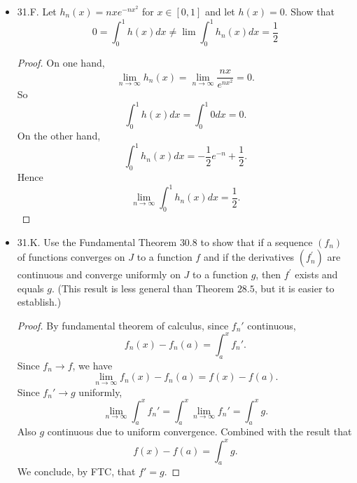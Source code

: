 \begin{itemize}
\item 31.F. Let $h_n(x)=n x e^{-n x^2}$ for $x \in[0,1]$ and let $h(x)=0$. Show that
\[
0=\int_0^1 h(x) d x \neq \lim \int_0^1 h_n(x) d x=\frac{1}{2}
\]
\begin{proof}
	On one hand, 
	\[
		\lim_{n \to \infty} h_n(x) = \lim_{n \to \infty} \frac{nx }{e^{n x^2}} = 0
	.\] 
	So
	\[
		\int _0^1 h(x) dx = \int _0^1 0 dx = 0
	.\] 
	On the other hand,
	\[
		\int_0^1 h_n(x)dx = -\frac{1}{2}e^{-n} + \frac{1}{2}
	.\] 
	Hence
	\[
		\lim_{n \to \infty} \int _0^1 h_n(x) dx = \frac{1}{2}
	.\] 
\end{proof}

\item 31.K. Use the Fundamental Theorem $30.8$ to show that if a sequence $\left(f_n\right)$ of functions converges on $J$ to a function $f$ and if the derivatives $\left(f_n^{\prime}\right)$ are continuous and converge uniformly on $J$ to a function $g$, then $f^{\prime}$ exists and equals $g$. (This result is less general than Theorem $28.5$, but it is easier to establish.)
\begin{proof}
	By fundamental theorem of calculus, since $f_n'$ continuous,
	\[
		f_n(x) - f_n(a) = \int _a^x f_n'
	.\] 
	Since $f_n \to f$, we have
	\[
		\lim_{n \to \infty} f_n(x) - f_n(a) = f(x) - f(a)
	.\] 
	Since $f_n' \to g$ uniformly,
	\[
		\lim_{n \to \infty} \int _a^x f_n' = \int_a^x \lim_{n \to \infty} f_n' = \int_a^x g
	.\] 
	Also $g$ continuous due to uniform convergence. Combined with the result that
	\[
		f(x) - f(a) = \int _a^x g
	.\] 
	We conclude, by FTC, that $f' = g$.
\end{proof}

\end{itemize}
